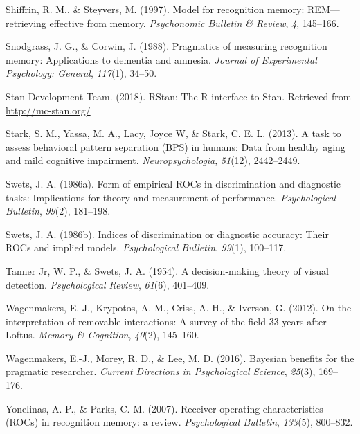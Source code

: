 \documentclass[
  english,
  ,man,floatsintext]{apa6}
\begin{document}
\leavevmode\hypertarget{ref-ShiffrinAndSteyvers1997}{}%
Shiffrin, R. M., \& Steyvers, M. (1997). Model for recognition memory: REM---retrieving effective from memory. \emph{Psychonomic Bulletin \& Review}, \emph{4}, 145--166.

\leavevmode\hypertarget{ref-SnodgrassAndCorwin1988}{}%
Snodgrass, J. G., \& Corwin, J. (1988). Pragmatics of measuring recognition memory: Applications to dementia and amnesia. \emph{Journal of Experimental Psychology: General}, \emph{117}(1), 34--50.

\leavevmode\hypertarget{ref-rstan}{}%
Stan Development Team. (2018). RStan: The R interface to Stan. Retrieved from \url{http://mc-stan.org/}

\leavevmode\hypertarget{ref-StarkEtAl2013}{}%
Stark, S. M., Yassa, M. A., Lacy, Joyce W, \& Stark, C. E. L. (2013). A task to assess behavioral pattern separation (BPS) in humans: Data from healthy aging and mild cognitive impairment. \emph{Neuropsychologia}, \emph{51}(12), 2442--2449.

\leavevmode\hypertarget{ref-Swets1986b}{}%
Swets, J. A. (1986a). Form of empirical ROCs in discrimination and diagnostic tasks: Implications for theory and measurement of performance. \emph{Psychological Bulletin}, \emph{99}(2), 181--198.

\leavevmode\hypertarget{ref-Swets1986a}{}%
Swets, J. A. (1986b). Indices of discrimination or diagnostic accuracy: Their ROCs and implied models. \emph{Psychological Bulletin}, \emph{99}(1), 100--117.

\leavevmode\hypertarget{ref-TannerAndSwets1954}{}%
Tanner Jr, W. P., \& Swets, J. A. (1954). A decision-making theory of visual detection. \emph{Psychological Review}, \emph{61}(6), 401--409.

\leavevmode\hypertarget{ref-WagenmakersEtAl2012}{}%
Wagenmakers, E.-J., Krypotos, A.-M., Criss, A. H., \& Iverson, G. (2012). On the interpretation of removable interactions: A survey of the field 33 years after Loftus. \emph{Memory \& Cognition}, \emph{40}(2), 145--160.

\leavevmode\hypertarget{ref-WagenmakersEtAl2016}{}%
Wagenmakers, E.-J., Morey, R. D., \& Lee, M. D. (2016). Bayesian benefits for the pragmatic researcher. \emph{Current Directions in Psychological Science}, \emph{25}(3), 169--176.

\leavevmode\hypertarget{ref-YonelinasAndParks2007}{}%
Yonelinas, A. P., \& Parks, C. M. (2007). Receiver operating characteristics (ROCs) in recognition memory: a review. \emph{Psychological Bulletin}, \emph{133}(5), 800--832.
\end{document}
